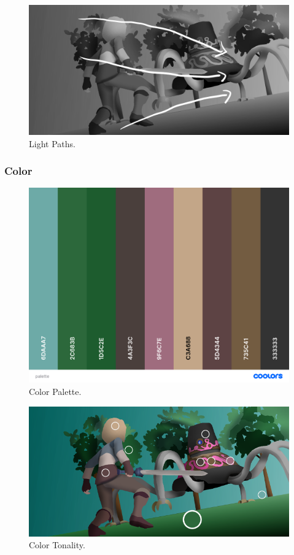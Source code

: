 \documentclass{cup-pan}
\begin{document}
            \begin{figure}[H]
                \includegraphics[width=\textwidth]{Imagenes/Fanart2/Analysis/recorrido luz.png}
                \caption{Light Paths.}
            \end{figure}

        \subsubsection{Color}

            \begin{figure}[H]
                \includegraphics[width=\textwidth]{Imagenes/Fanart2/Analysis/palette.png}
                \caption{Color Palette.}
            \end{figure}

            \begin{figure}[H]
                \includegraphics[width=\textwidth]{Imagenes/Fanart2/Analysis/tonalidad.png}
                \caption{Color Tonality.}
            \end{figure}
\end{document}
